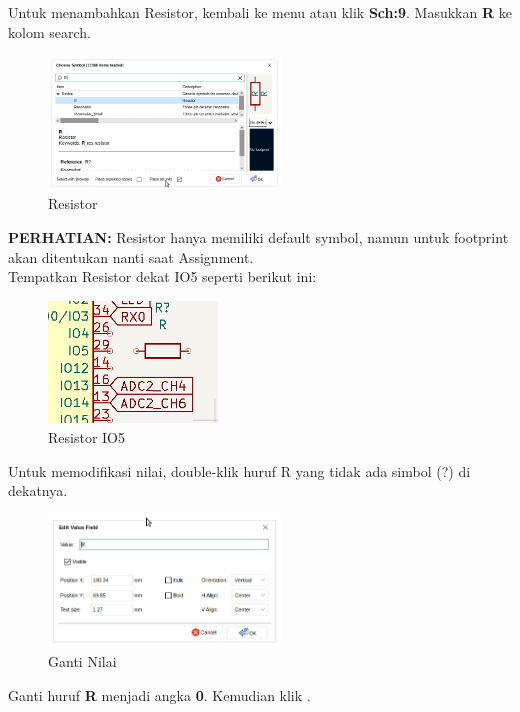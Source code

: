 \documentclass[12pt]{book}
\begin{document}
	Untuk menambahkan Resistor, kembali ke menu  atau klik \textbf{Sch:9}.
	Masukkan \textbf{R} ke kolom search.

	\begin{figure}[!ht]
		\centering
		\includegraphics[width=0.55\textwidth]{images/sch/sch_9}
		\caption{Resistor}
	\end{figure}

	\textbf{PERHATIAN:} Resistor hanya memiliki default symbol, namun untuk footprint akan
	ditentukan nanti saat Assignment.\\

	Tempatkan Resistor dekat IO5 seperti berikut ini:
	\begin{figure}[!ht]
		\centering
		\includegraphics[width=0.4\textwidth]{images/sch/sch_10}
		\caption{Resistor IO5}
	\end{figure}

	Untuk memodifikasi nilai, double-klik huruf R yang tidak ada simbol (?) di dekatnya.
	\begin{figure}[!ht]
		\centering
		\includegraphics[width=0.55\textwidth]{images/sch/sch_11}
		\caption{Ganti Nilai}
	\end{figure}

	Ganti huruf \textbf{R} menjadi angka \textbf{0}. Kemudian klik .
\end{document}
